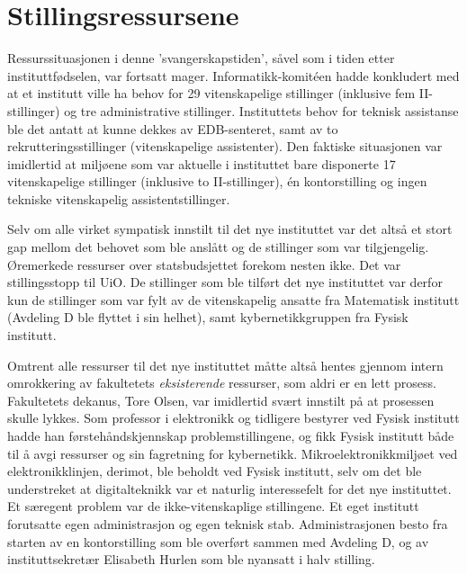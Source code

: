 \section{Stillingsressursene}

Ressurssituasjonen i denne 'svangerskapstiden', såvel som i tiden etter instituttfødselen, var fortsatt mager. Informatikk-komitéen hadde konkludert med at et institutt ville ha behov for 29 vitenskapelige stillinger (inklusive fem II-stillinger) og tre administrative stillinger. Instituttets behov for teknisk assistanse ble det antatt at kunne dekkes av EDB-senteret, samt av to rekrutteringsstillinger (vitenskapelige assistenter). Den faktiske situasjonen var imidlertid at miljøene som var aktuelle i instituttet bare disponerte 17 vitenskapelige stillinger (inklusive to II-stillinger), én kontorstilling og ingen tekniske vitenskapelig assistentstillinger. 

Selv om alle virket sympatisk innstilt til det nye instituttet var det altså et stort gap mellom det behovet som ble anslått og de stillinger som var tilgjengelig. Øremerkede ressurser over statsbudsjettet forekom nesten ikke. Det var stillingsstopp til UiO. De stillinger som ble tilført det nye instituttet var derfor kun de stillinger som var fylt av de vitenskapelig ansatte fra Matematisk institutt (Avdeling D ble flyttet i sin helhet), samt kybernetikkgruppen fra Fysisk institutt.

Omtrent alle ressurser til det nye instituttet måtte altså hentes gjennom intern omrokkering av fakultetets \textit{eksisterende} ressurser, som aldri er en lett prosess. Fakultetets dekanus, Tore Olsen, var imidlertid svært innstilt på at prosessen skulle lykkes. Som professor i elektronikk og tidligere bestyrer ved Fysisk institutt hadde han førstehåndskjennskap problemstillingene, og fikk Fysisk institutt både til å avgi ressurser og sin fagretning for kybernetikk. Mikroelektronikkmiljøet ved elektronikklinjen, derimot, ble beholdt ved Fysisk institutt, selv om det ble understreket at digitalteknikk var et naturlig interessefelt for det nye instituttet. Et særegent problem var de ikke-vitenskaplige stillingene. Et eget institutt forutsatte egen administrasjon og egen teknisk stab. Administrasjonen besto fra starten av en kontorstilling som ble overført sammen med Avdeling D, og av instituttsekretær Elisabeth Hurlen som ble nyansatt i halv stilling.

